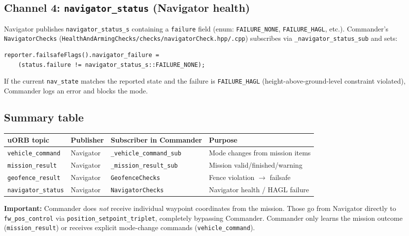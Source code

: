 \documentclass[12pt,a4paper]{article}
\begin{document}
\subsection{Channel 4: \texttt{navigator\_status} (Navigator health)}

Navigator publishes \texttt{navigator\_status\_s} containing a
\texttt{failure} field (enum: \texttt{FAILURE\_NONE}, \texttt{FAILURE\_HAGL},
etc.).  Commander's \texttt{NavigatorChecks}
(\texttt{HealthAndArmingChecks/checks/navigatorCheck.hpp/.cpp}) subscribes via
\texttt{\_navigator\_status\_sub} and sets:
\begin{verbatim}
reporter.failsafeFlags().navigator_failure =
    (status.failure != navigator_status_s::FAILURE_NONE);
\end{verbatim}
If the current \texttt{nav\_state} matches the reported state and the failure
is \texttt{FAILURE\_HAGL} (height-above-ground-level constraint violated),
Commander logs an error and blocks the mode.

\subsection{Summary table}

\begin{center}\begin{tabular}{llll}\toprule
uORB topic & Publisher & Subscriber in Commander & Purpose \\\midrule
\texttt{vehicle\_command}  & Navigator & \texttt{\_vehicle\_command\_sub} & Mode changes from mission items \\
\texttt{mission\_result}   & Navigator & \texttt{\_mission\_result\_sub}  & Mission valid/finished/warning \\
\texttt{geofence\_result}  & Navigator & \texttt{GeofenceChecks}          & Fence violation $\to$ failsafe \\
\texttt{navigator\_status} & Navigator & \texttt{NavigatorChecks}         & Navigator health / HAGL failure \\
\bottomrule\end{tabular}\end{center}

\bigskip
\noindent\textbf{Important:} Commander does \emph{not} receive individual
waypoint coordinates from the mission.  Those go from Navigator directly to
\texttt{fw\_pos\_control} via \texttt{position\_setpoint\_triplet}, completely
bypassing Commander.  Commander only learns the mission outcome
(\texttt{mission\_result}) or receives explicit mode-change commands
(\texttt{vehicle\_command}).
\end{document}
